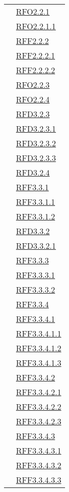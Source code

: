 \begin{longtable}{|>{\centering}m{5cm}|m{5cm}<{\centering}|}
& \hyperlink{RFO2.2.1}{RFO2.2.1}\\
& \hyperlink{RFO2.2.1.1}{RFO2.2.1.1}\\
& \hyperlink{RFF2.2.2}{RFF2.2.2}\\
& \hyperlink{RFF2.2.2.1}{RFF2.2.2.1}\\
& \hyperlink{RFF2.2.2.2}{RFF2.2.2.2}\\
& \hyperlink{RFO2.2.3}{RFO2.2.3}\\
& \hyperlink{RFO2.2.4}{RFO2.2.4}\\
& \hyperlink{RFD3.2.3}{RFD3.2.3}\\
& \hyperlink{RFD3.2.3.1}{RFD3.2.3.1}\\
& \hyperlink{RFD3.2.3.2}{RFD3.2.3.2}\\
& \hyperlink{RFD3.2.3.3}{RFD3.2.3.3}\\
& \hyperlink{RFD3.2.4}{RFD3.2.4}\\
& \hyperlink{RFF3.3.1}{RFF3.3.1}\\
& \hyperlink{RFF3.3.1.1}{RFF3.3.1.1}\\
& \hyperlink{RFF3.3.1.2}{RFF3.3.1.2}\\
& \hyperlink{RFD3.3.2}{RFD3.3.2}\\
& \hyperlink{RFD3.3.2.1}{RFD3.3.2.1}\\
& \hyperlink{RFF3.3.3}{RFF3.3.3}\\
& \hyperlink{RFF3.3.3.1}{RFF3.3.3.1}\\
& \hyperlink{RFF3.3.3.2}{RFF3.3.3.2}\\
& \hyperlink{RFF3.3.4}{RFF3.3.4}\\
& \hyperlink{RFF3.3.4.1}{RFF3.3.4.1}\\
& \hyperlink{RFF3.3.4.1.1}{RFF3.3.4.1.1}\\
& \hyperlink{RFF3.3.4.1.2}{RFF3.3.4.1.2}\\
& \hyperlink{RFF3.3.4.1.3}{RFF3.3.4.1.3}\\
& \hyperlink{RFF3.3.4.2}{RFF3.3.4.2}\\
& \hyperlink{RFF3.3.4.2.1}{RFF3.3.4.2.1}\\
& \hyperlink{RFF3.3.4.2.2}{RFF3.3.4.2.2}\\
& \hyperlink{RFF3.3.4.2.3}{RFF3.3.4.2.3}\\
& \hyperlink{RFF3.3.4.3}{RFF3.3.4.3}\\
& \hyperlink{RFF3.3.4.3.1}{RFF3.3.4.3.1}\\
& \hyperlink{RFF3.3.4.3.2}{RFF3.3.4.3.2}\\
& \hyperlink{RFF3.3.4.3.3}{RFF3.3.4.3.3}\\

\end{longtable}
